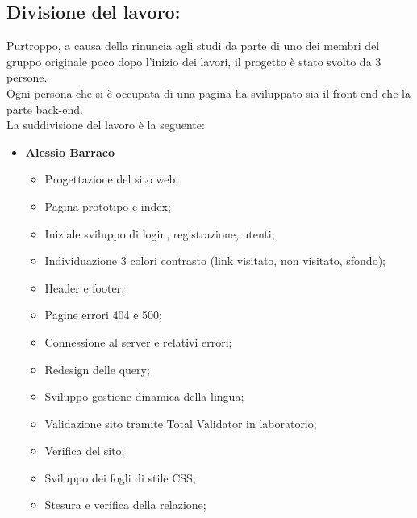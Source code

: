 \documentclass[a4paper, 11pt]{article}
\begin{document}
\subsection{Divisione del lavoro:}
Purtroppo, a causa della rinuncia agli studi da parte di uno dei membri del gruppo originale poco dopo l'inizio dei lavori, il progetto è stato svolto da 3 persone. \\

Ogni persona che si è occupata di una pagina ha sviluppato sia il front-end che la parte back-end. \\
La suddivisione del lavoro è la seguente:

\begin{itemize}

\item \textbf{Alessio Barraco}
	\begin{itemize}
	\item Progettazione del sito web;
        \item Pagina prototipo e index;
        \item Iniziale sviluppo di login, registrazione, utenti;
        \item Individuazione 3 colori contrasto (link visitato, non visitato, sfondo);
        \item Header e footer;
        \item Pagine errori 404 e 500;
        \item Connessione al server e relativi errori;
        \item Redesign delle query;
        \item Sviluppo gestione dinamica della lingua;
        \item Validazione sito tramite Total Validator in laboratorio;
        \item Verifica del sito;
        \item Sviluppo dei fogli di stile CSS;
        \item Stesura e verifica della relazione;


\end{itemize}
\end{itemize}
\end{document}
